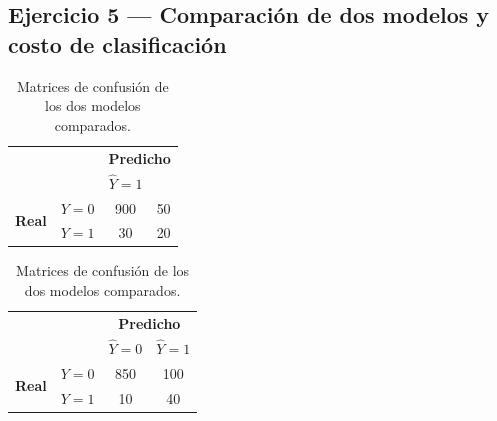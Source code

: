 \subsection{Ejercicio 5 --- Comparación de dos modelos y costo de clasificación}

\begin{table}[H]
\centering
\begin{minipage}{0.45\textwidth}
\centering
\begin{tabular}{cc|cc}
    & & \multicolumn{2}{c}{\textbf{Predicho}} \\
    & & $\hat Y=1$ \\
    \hline
    \multirow{2}{*}{\textbf{Real}} & $Y=0$ & 900 & 50 \\
    & $Y=1$ & 30 & 20 \\
\end{tabular}
\caption*{Modelo A}
\end{minipage}
\hfill
\begin{minipage}{0.45\textwidth}
\centering
\begin{tabular}{cc|cc}
    & & \multicolumn{2}{c}{\textbf{Predicho}} \\
    & & $\hat Y=0$ & $\hat Y=1$ \\
    \hline
    \multirow{2}{*}{\textbf{Real}} & $Y=0$ & 850 & 100 \\
    & $Y=1$ & 10 & 40 \\
\end{tabular}
\caption*{Modelo B}
\end{minipage}
\caption{Matrices de confusión de los dos modelos comparados.}
\end{table}

